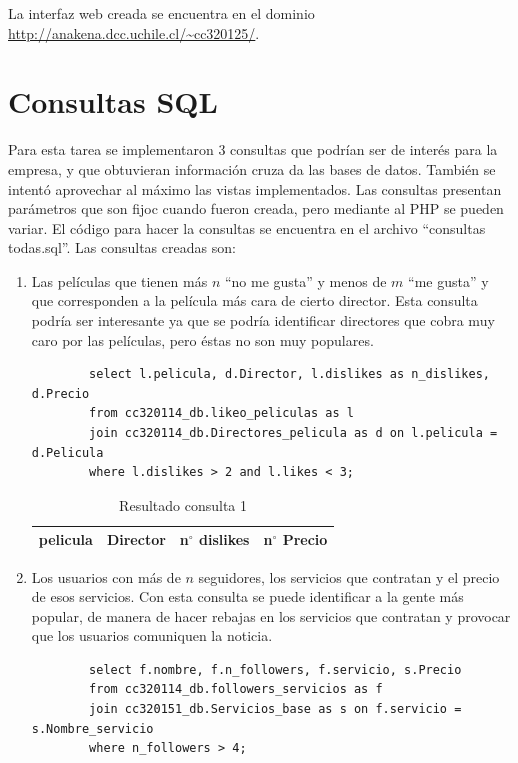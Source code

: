 \documentclass[12pt,letterpaper]{article}
\begin{document}
La interfaz web creada se encuentra en el dominio \url{http://anakena.dcc.uchile.cl/~cc320125/}.

\section{Consultas SQL}

Para esta tarea se implementaron 3 consultas que podrían ser de interés para la empresa, y que obtuvieran información cruza da las bases de datos. También se intentó aprovechar al máximo las vistas implementados. Las consultas presentan parámetros que son fijoc cuando fueron creada, pero mediante al PHP se pueden variar. El código para hacer la consultas se encuentra en el archivo ``consultas todas.sql''.  Las consultas creadas son:

\begin{enumerate}
	
	\item Las películas que tienen más $n$ ``no me gusta'' y menos de $m$ ``me gusta'' y que corresponden a la película más cara de cierto director. Esta consulta podría ser interesante ya que se podría identificar directores que cobra muy caro por las películas, pero éstas no son muy populares.
	
	\begin{verbatim}
		select l.pelicula, d.Director, l.dislikes as n_dislikes, d.Precio
		from cc320114_db.likeo_peliculas as l 
		join cc320114_db.Directores_pelicula as d on l.pelicula = d.Pelicula
		where l.dislikes > 2 and l.likes < 3;
	\end{verbatim}
	
	\begin{table}[ht!]
			\centering
			\begin{tabular}{||c|l|l|l||} \hline 
				pelicula & Director & n$^\circ$ dislikes & n$^\circ$ Precio\\ \hline
			\end{tabular}
			\caption {Resultado consulta 1}  
	\end{table}
	
	\item Los usuarios con más de $n$ seguidores, los servicios que contratan y el precio de esos servicios. Con esta consulta se puede identificar a la gente más popular, de manera de hacer rebajas en los servicios que contratan y provocar que los usuarios comuniquen la noticia.
	
	\begin{verbatim}
		select f.nombre, f.n_followers, f.servicio, s.Precio
		from cc320114_db.followers_servicios as f
		join cc320151_db.Servicios_base as s on f.servicio = s.Nombre_servicio
		where n_followers > 4;
	\end{verbatim}
	

\end{enumerate}
\end{document}
